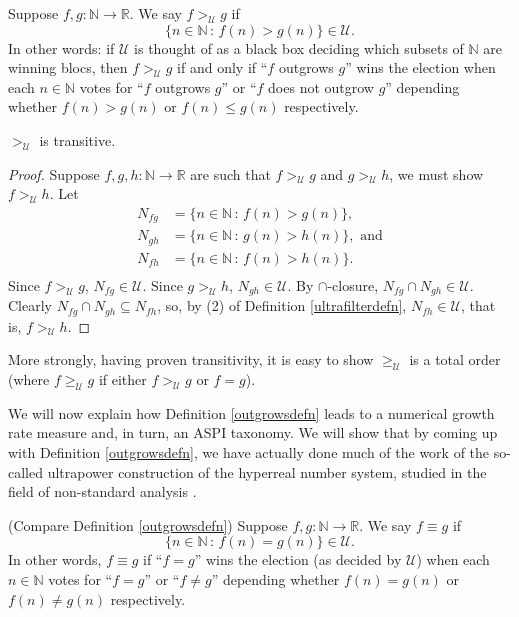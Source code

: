 \documentclass[twoside,11pt]{article}
\begin{document}
\begin{definition}
\label{outgrowsdefn}
    Suppose $f,g:\mathbb N\to\mathbb R$.
    We say $f>_\mathcal U g$ if
    \[\{n\in\mathbb N\,:\,f(n)>g(n)\}\in \mathcal U.\]
    In other words: if $\mathcal U$ is thought of as a black box deciding which
    subsets of $\mathbb N$ are winning blocs, then $f>_\mathcal U g$
    if and only if ``$f$ outgrows $g$'' wins the election when
    each $n\in\mathbb N$ votes for ``$f$ outgrows $g$'' or ``$f$ does not outgrow $g$''
    depending whether $f(n)>g(n)$ or $f(n)\leq g(n)$ respectively.
\end{definition}

\begin{lemma}
\label{transitivitylemma}
    $>_\mathcal U$ is transitive.
\end{lemma}

\begin{proof}
    Suppose $f,g,h:\mathbb N\to\mathbb R$
    are such that $f>_\mathcal U g$ and $g>_\mathcal U h$, we must show
    $f>_\mathcal U h$.
    Let
    \begin{align*}
        N_{fg} &= \{n\in\mathbb N\,:\,f(n)>g(n)\},\\
        N_{gh} &= \{n\in\mathbb N\,:\,g(n)>h(n)\},\mbox{ and}\\
        N_{fh} &= \{n\in\mathbb N\,:\,f(n)>h(n)\}.\\
    \end{align*}
    Since $f>_\mathcal U g$, $N_{fg}\in\mathcal U$.
    Since $g>_\mathcal U h$, $N_{gh}\in\mathcal U$.
    By $\cap$-closure, $N_{fg}\cap N_{gh}\in\mathcal U$.
    Clearly $N_{fg}\cap N_{gh}\subseteq N_{fh}$, so, by (2) of
    Definition \ref{ultrafilterdefn},
    $N_{fh}\in \mathcal U$, that is, $f>_\mathcal U h$.
\end{proof}

More strongly, having proven transitivity, it is easy to show $\geq_\mathcal U$
is a total order (where $f\geq_\mathcal U g$ if either $f>_\mathcal U g$ or $f=g$).

We will now explain how Definition \ref{outgrowsdefn} leads to a numerical
growth rate measure and, in turn, an ASPI taxonomy.
We will show that by coming up with Definition \ref{outgrowsdefn}, we have actually
done much of the work of the so-called ultrapower construction of
the hyperreal number system, studied in the field of non-standard
analysis \citep{robinson, goldblatt2012lectures}.

\begin{definition}
\label{equivrelndefn}
(Compare Definition \ref{outgrowsdefn})
    Suppose $f,g:\mathbb N\to\mathbb R$. We say
    $f\equiv g$ if
    \[
    \{n\in\mathbb N\,:\, f(n) = g(n)\} \in \mathcal U.
    \]
    In other words, $f\equiv g$ if ``$f=g$'' wins the election (as decided by
    $\mathcal U$) when each
    $n\in\mathbb N$ votes for ``$f=g$'' or ``$f\not=g$'' depending whether
    $f(n)=g(n)$ or $f(n)\neq g(n)$ respectively.
\end{definition}
\end{document}
